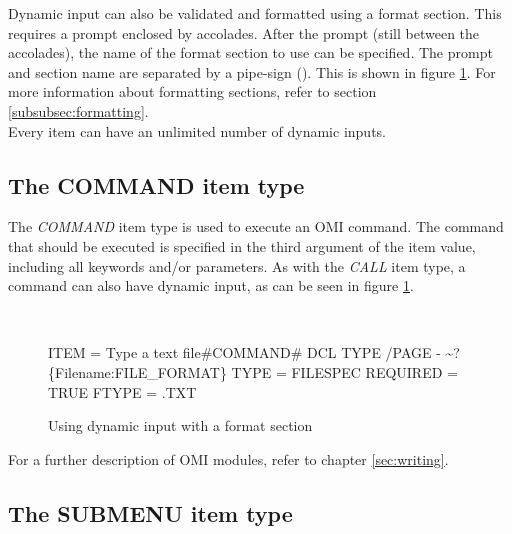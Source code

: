 \documentclass[a4paper]{book}
\renewcommand{\indent}{\hspace*{5mm}}
\begin{document}
Dynamic input can also be validated and formatted using a format section. 
This requires a prompt enclosed by accolades. After the prompt (still 
between the accolades), the name of the format section to use can be 
specified. The prompt and section name are separated by a pipe-sign (\textbar).
This is shown in figure \ref{fig:dyninputformat}.
For more information about formatting sections, refer to section 
\ref{subsubsec:formatting}. \\
Every item can have an unlimited number of dynamic inputs.

\subsection{The COMMAND item type}
\label{subsubsec:mylabel35}

The \textsl{COMMAND} item type is used to 
execute an OMI command. The command that should be executed is specified in 
the third argument of the item value, including all keywords and/or 
parameters. As with the \textsl{CALL} item type, a 
command can also have dynamic input, as can be seen in
figure \ref{fig:dyninputformat}.

\begin{figure}[h!tb]
\begin{minipage}[h!tb]{\textwidth}
\hrulefill \\
\begin{ttfamily}
\indent ITEM = Type a text file{\#}COMMAND{\#} DCL TYPE /PAGE - \newline
\indent\indent\~{}?{\{}Filename:\textbar FILE{\_}FORMAT{\}} \newline
 \newline
{} \newline
\indent TYPE = FILESPEC \newline
\indent REQUIRED = TRUE \newline
\indent FTYPE = .TXT
\end{ttfamily}
\caption{Using dynamic input with a format section}\label{fig:dyninputformat}
\hrulefill
\end{minipage}
\end{figure}

For a further description of OMI modules, refer to chapter \ref{sec:writing}.

\subsection{The SUBMENU item type}
\label{subsubsec:mylabel36}
\end{document}
